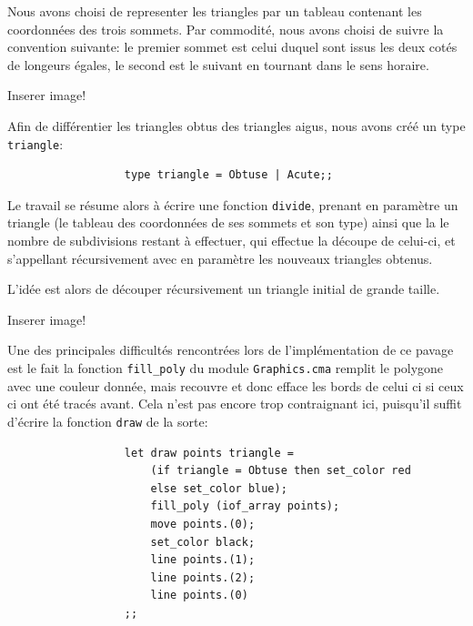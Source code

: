 \documentclass[a4paper, 11pt]{article}%
\begin{document}
                Nous avons choisi de representer les triangles par un
                tableau contenant les coordonnées des trois
                sommets. Par commodité, nous avons choisi de suivre la
                convention suivante: le premier sommet est celui duquel sont issus les deux
                cotés de longeurs égales, le second est le suivant en
                tournant dans le sens horaire.

                Inserer image!

                Afin de différentier les triangles obtus des triangles
                aigus, nous avons créé un type \texttt{triangle}:

		\begin{lstlisting}
                  type triangle = Obtuse | Acute;;
		\end{lstlisting}

                Le travail se résume alors à écrire une fonction \texttt{divide},
                prenant en paramètre un triangle (le tableau des
                coordonnées de ses sommets et son type) ainsi que la
                le nombre de subdivisions restant à effectuer, qui
                effectue la découpe de celui-ci, et s'appellant
                récursivement avec en paramètre les nouveaux triangles
                obtenus.

                L'idée est alors de découper récursivement un triangle
                initial de grande taille. 

                Inserer image!

                Une des principales difficultés rencontrées lors de
                l'implémentation de ce pavage est le fait la fonction
                \texttt{fill\_poly} du module \texttt{Graphics.cma}
                remplit le polygone avec une couleur donnée, mais
                recouvre et donc efface les bords de celui ci si ceux
                ci ont été tracés avant. Cela n'est pas encore trop
                contraignant ici, puisqu'il suffit d'écrire la
                fonction \texttt{draw} de la sorte:

                \begin{lstlisting}
                  let draw points triangle =
                      (if triangle = Obtuse then set_color red
                      else set_color blue);
                      fill_poly (iof_array points);
                      move points.(0);
                      set_color black;
                      line points.(1);  
                      line points.(2);
                      line points.(0)
                  ;;
                \end{lstlisting}
                
\end{document}
